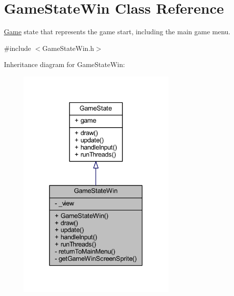 \hypertarget{class_game_state_win}{\section{Game\+State\+Win Class Reference}
\label{class_game_state_win}
}


\hyperlink{class_game}{Game} state that represents the game start, including the main game menu.  




{\ttfamily \#include $<$Game\+State\+Win.\+h$>$}



Inheritance diagram for Game\+State\+Win\+:\nopagebreak
\begin{figure}[H]
\begin{center}
\leavevmode
\includegraphics[width=222pt]{class_game_state_win__inherit__graph}
\end{center}
\end{figure}


